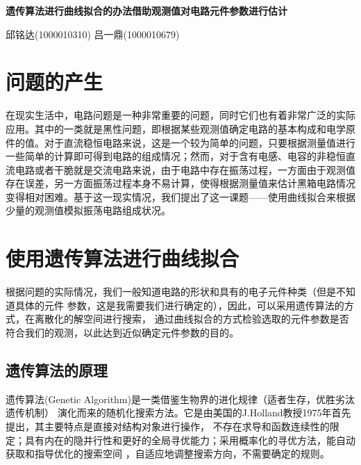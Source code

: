 \documentclass[a4paper]{article}
\begin{document}

%
%
\begin{center}
	\Huge \textbf{遗传算法进行曲线拟合的办法借助观测值对电路元件参数进行估计}
\end{center}
\vspace{1 in}
\begin{center}
	\normalsize 邱铭达(1000010310) 吕一鼎(1000010679)
\end{center}
\newpage


\tableofcontents


\section{问题的产生}
在现实生活中，电路问题是一种非常重要的问题，同时它们也有着非常广泛的实际应用。其中的一类就是黑性问题，即根据某些观测值确定电路的基本构成和电学原件的值。对于直流稳恒电路来说，这是一个较为简单的问题，只要根据测量值进行一些简单的计算即可得到电路的组成情况；然而，对于含有电感、电容的非稳恒直流电路或者干脆就是交流电路来说，由于电路中存在振荡过程，一方面由于观测值存在误差，另一方面振荡过程本身不易计算，使得根据测量值来估计黑箱电路情况变得相对困难。基于这一现实情况，我们提出了这一课题——使用曲线拟合来根据少量的观测值模拟振荡电路组成状况。
%
\section{使用遗传算法进行曲线拟合}

根据问题的实际情况，我们一般知道电路的形状和具有的电子元件种类（但是不知道具体的元件
参数，这是我需要我们进行确定的），因此，可以采用遗传算法的方式，在离散化的解空间进行搜索，
通过曲线拟合的方式检验选取的元件参数是否符合我们的观测，以此达到近似确定元件参数的目的。

\subsection{遗传算法的原理}

遗传算法(Genetic Algorithm)是一类借鉴生物界的进化规律（适者生存，优胜劣汰遗传机制）
演化而来的随机化搜索方法。它是由美国的J.Holland教授1975年首先提出，其主要特点是直接对结构对象进行操作，
不存在求导和函数连续性的限定；具有内在的隐并行性和更好的全局寻优能力；采用概率化的寻优方法，能自动获取和指导优化的搜索空间
，自适应地调整搜索方向，不需要确定的规则。
\end{document}
